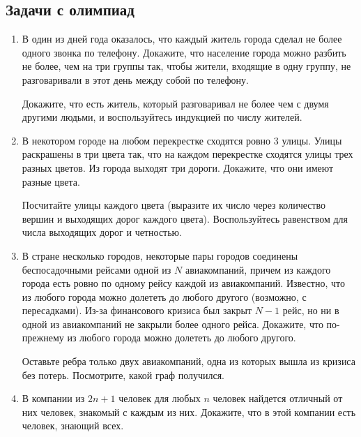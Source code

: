 \subsection{Задачи с олимпиад}
\begin{enumerate}
    \item В один из дней года оказалось, что каждый житель города 
        сделал не более одного звонка по телефону. Докажите, что
        население города можно разбить не более, чем на три группы 
        так, чтобы жители, входящие в одну группу, не разговаривали в 
        этот день между собой по телефону.
        \begin{hint}
            Докажите, что есть житель, который разговаривал не более
            чем с двумя другими людьми, и воспользуйтесь индукцией 
            по числу жителей.
        \end{hint}
    \item В некотором городе на любом перекрестке сходятся ровно 3
        улицы. Улицы раскрашены в три цвета так, что на каждом
        перекрестке сходятся улицы трех разных цветов. Из города
        выходят три дороги. Докажите, что они имеют разные цвета.
        \begin{hint}
            Посчитайте улицы каждого цвета (выразите их число через
            количество вершин и выходящих дорог каждого цвета).
            Воспользуйтесь равенством для числа выходящих дорог
            и четностью.
        \end{hint}
    \item В стране несколько городов, некоторые пары городов
        соединены беспосадочными рейсами одной из $N$ авиакомпаний,
        причем из каждого города есть ровно по одному рейсу каждой из
        авиакомпаний. Известно, что из любого города можно долететь
        до любого другого (возможно, с пересадками). Из-за
        финансового кризиса был закрыт $N-1$ рейс, но ни в одной
        из авиакомпаний не закрыли более одного рейса. Докажите,
        что по-прежнему из любого города можно долететь до любого
        другого.
        \begin{hint}
            Оставьте ребра только двух авиакомпаний, одна из которых
            вышла из кризиса без потерь. Посмотрите, какой граф
            получился.
        \end{hint}
    \item В компании из $2n+1$ человек для любых $n$ человек
        найдется отличный от них человек, знакомый с каждым из них.
        Докажите, что в этой компании есть человек, знающий всех.

\end{enumerate}
